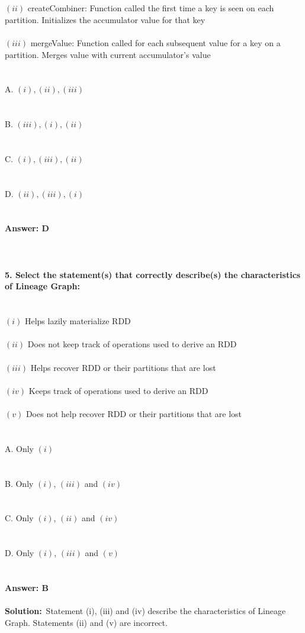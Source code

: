 \documentclass[prl,twocolumn,showpacs,preprintnumbers,superscriptaddress]{revtex4}
\theoremstyle{plain}
\theoremstyle{definition}
\begin{document}
\begin{widetext}
\\
\\
$(ii)$ createCombiner: Function called the first time a key is seen on each partition. Initializes the accumulator value for that key 
\\
\\
$(iii)$ mergeValue: Function called for each subsequent value for a key on a partition. Merges value with current accumulator’s value 
\\
\\
\\
A. $(i), (ii), (iii)$
\\
\\
\\
B. $(iii), (i), (ii)$
\\
\\
\\
C. $(i), (iii), (ii)$
\\
\\
\\
D. $(ii), (iii), (i)$
\\
\\
\\
\textbf{Answer: D}
\\
\\
\\
\\
\newpage
\noindent\textbf{5. Select the statement(s) that correctly describe(s) the characteristics of Lineage Graph:}
\\
\\
\\
$(i)$ Helps lazily materialize RDD 
\\
\\
$(ii)$ Does not keep track of operations used to derive an RDD
\\
\\
$(iii)$ Helps recover RDD or their partitions that are lost 
\\
\\
$(iv)$ Keeps track of operations used to derive an RDD 
\\
\\
$(v)$ Does not help recover RDD or their partitions that are lost 
\\
\\
\\
\noindent A. Only $(i)$ 
\\
\\
\\
B.  Only $(i)$, $(iii)$ and $(iv)$ 
\\
\\
\\
C. Only $(i)$, $(ii)$ and $(iv)$
\\
\\
\\
D. Only $(i)$, $(iii)$ and $(v)$
\\
\\
\\
\textbf{Answer: B}
\\
\\
\textbf{Solution:}\ 
Statement (i), (iii) and (iv) describe the characteristics of Lineage Graph. Statements (ii) and (v) are incorrect.
\\
\\
\\
\end{widetext}
\end{document}
